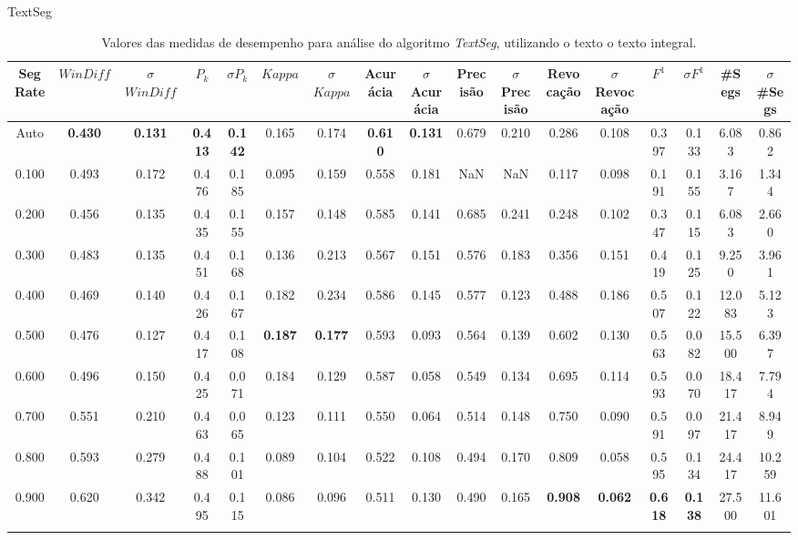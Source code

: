 \center TextSeg
\tiny\begin{longtable}[c]{|c|c|c|c|c|c|c|c|c|c|c|c|c|c|c|c|c|} 
\hline 
 Seg Rate & $WinDiff$ & $\sigma$$WinDiff$ & $P_k$ & $\sigma$$P_k$ & $Kappa$ & $\sigma$$Kappa$ & Acurácia & $\sigma$Acurácia & Precisão & $\sigma$Precisão & Revocação & $\sigma$Revocação & $F^1$ & $\sigma$$F^1$ & \#Segs & $\sigma$\#Segs\\ \hline 
 Auto & \cellcolor{gray!20} \textbf{0.430} & \cellcolor{gray!20} \textbf{0.131} & \cellcolor{gray!20} \textbf{0.413} & \cellcolor{gray!20} \textbf{0.142} & 0.165 & 0.174 & \cellcolor{gray!20} \textbf{0.610} & \cellcolor{gray!20} \textbf{0.131} & 0.679 & 0.210 & 0.286 & 0.108 & 0.397 & 0.133 & 6.083 & 0.862  \\ \hline 
  0.100 & 0.493 & 0.172 & 0.476 & 0.185 & 0.095 & 0.159 & 0.558 & 0.181 & NaN & NaN & 0.117 & 0.098 & 0.191 & 0.155 & 3.167 & 1.344  \\ \hline 
  0.200 & 0.456 & 0.135 & 0.435 & 0.155 & 0.157 & 0.148 & 0.585 & 0.141 & 0.685 & 0.241 & 0.248 & 0.102 & 0.347 & 0.115 & 6.083 & 2.660  \\ \hline 
  0.300 & 0.483 & 0.135 & 0.451 & 0.168 & 0.136 & 0.213 & 0.567 & 0.151 & 0.576 & 0.183 & 0.356 & 0.151 & 0.419 & 0.125 & 9.250 & 3.961  \\ \hline 
  0.400 & 0.469 & 0.140 & 0.426 & 0.167 & 0.182 & 0.234 & 0.586 & 0.145 & 0.577 & 0.123 & 0.488 & 0.186 & 0.507 & 0.122 & 12.083 & 5.123  \\ \hline 
  0.500 & 0.476 & 0.127 & 0.417 & 0.108 & \cellcolor{gray!20} \textbf{0.187} & \cellcolor{gray!20} \textbf{0.177} & 0.593 & 0.093 & 0.564 & 0.139 & 0.602 & 0.130 & 0.563 & 0.082 & 15.500 & 6.397  \\ \hline 
  0.600 & 0.496 & 0.150 & 0.425 & 0.071 & 0.184 & 0.129 & 0.587 & 0.058 & 0.549 & 0.134 & 0.695 & 0.114 & 0.593 & 0.070 & 18.417 & 7.794  \\ \hline 
  0.700 & 0.551 & 0.210 & 0.463 & 0.065 & 0.123 & 0.111 & 0.550 & 0.064 & 0.514 & 0.148 & 0.750 & 0.090 & 0.591 & 0.097 & 21.417 & 8.949  \\ \hline 
  0.800 & 0.593 & 0.279 & 0.488 & 0.101 & 0.089 & 0.104 & 0.522 & 0.108 & 0.494 & 0.170 & 0.809 & 0.058 & 0.595 & 0.134 & 24.417 & 10.259  \\ \hline 
  0.900 & 0.620 & 0.342 & 0.495 & 0.115 & 0.086 & 0.096 & 0.511 & 0.130 & 0.490 & 0.165 & \cellcolor{gray!20} \textbf{0.908} & \cellcolor{gray!20} \textbf{0.062} & \cellcolor{gray!20} \textbf{0.618} & \cellcolor{gray!20} \textbf{0.138} & 27.500 & 11.601  \\ \hline 
 \caption{Valores das medidas de desempenho para análise do algoritmo \textit{TextSeg}, utilizando o texto o texto integral.}
 \end{longtable} 

